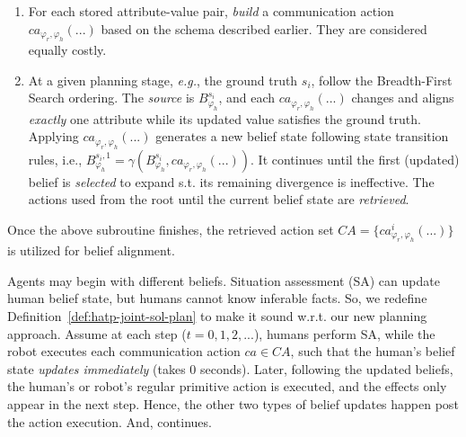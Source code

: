 \documentclass[letterpaper]{article} %
\begin{document}
\begin{itemize}
\begin{enumerate}
        \item For each stored attribute-value pair, \textit{build} a communication action $ca_{\varphi_r, \varphi_h}(...)$ based on the schema described earlier. They are considered equally costly.  
        \item 
        At a given planning stage, \textit{e.g.}, the ground truth $s_i$, follow the Breadth-First Search ordering. 
        The \textit{source} is $B_{\varphi_h}^{s_i}$, and each $ca_{\varphi_r, \varphi_h}(...)$ changes and aligns \textit{exactly} one attribute while its updated value satisfies the ground truth. 
        Applying $ca_{\varphi_r, \varphi_h}(...)$ generates a new belief state following state transition rules, i.e., $B_{\varphi_h}^{s_i,1} = \gamma(B_{\varphi_h}^{s_i}, ca_{\varphi_r, \varphi_h}(...))$.
        It continues until the first (updated) belief is \textit{selected} to expand s.t. its remaining divergence is ineffective. The actions used from the root until the current belief state are \textit{retrieved}.
    \end{enumerate}
    Once the above subroutine finishes, the retrieved action set $\mathit{CA} = \{ca^{i}_{\varphi_r,\varphi_h}(...)\}$ is utilized for belief alignment. 
\end{itemize}



Agents may begin with different beliefs. Situation assessment (SA) can update human belief state, but humans cannot know inferable facts. So, we redefine Definition~\ref{def:hatp-joint-sol-plan} to make it sound w.r.t. our new planning approach. 
Assume at each step ($t=0,1,2,...$), humans perform SA, while the robot executes each communication action $ca \in \mathit{CA}$, such that the human's belief state \textit{updates immediately} (takes $0$ seconds). 
Later, following the updated beliefs, the human's or robot's regular primitive action is executed, and the effects only appear in the next step. Hence, the other two types of belief updates happen post the action execution. And, continues. 
\end{document}
